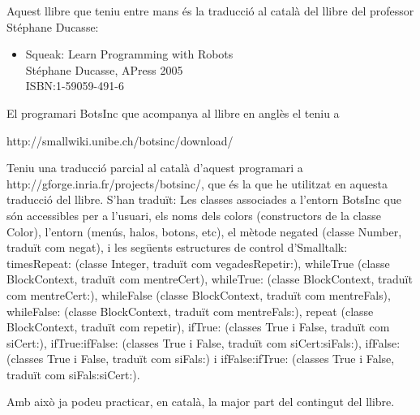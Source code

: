 \noindent
Aquest llibre que teniu entre mans és la traducció al català del llibre del professor Stéphane Ducasse:

\vspace*{3mm}

\noindent
\begin{itemize}
\item[] \textsf{Squeak: Learn Programming with Robots} \\ 
Stéphane Ducasse, APress 2005\\
ISBN:1-59059-491-6
\end{itemize}

\vspace*{3mm}

\noindent
El programari \textsf{BotsInc} que acompanya al llibre en anglès el teniu a 

\noindent
\textsf{http://smallwiki.unibe.ch/botsinc/download/}

\vspace*{3mm}

\noindent
Teniu una traducció parcial al català d'aquest programari a \textsf{http://gforge.inria.fr/projects/botsinc/}, que és la que he utilitzat en aquesta traducció del llibre. S'han traduït: Les classes associades a l'entorn \textsf{BotsInc} que són accessibles per a l'usuari, els noms dels colors (constructors de la classe \textsf{Color}), l'entorn (menús, halos, botons, etc), el mètode
\textsf{negated}  (classe \textsf{Number}, traduït com \textsf{negat}), i les següents estructures de control d'Smalltalk:
\textsf{timesRepeat:}  (classe \textsf{Integer}, traduït com \textsf{vegadesRepetir:}),
 \textsf{whileTrue}  (classe \textsf{BlockContext}, traduït com \textsf{mentreCert}),
 \textsf{whileTrue:}  (classe \textsf{BlockContext}, traduït com \textsf{mentreCert:}),
 \textsf{whileFalse}  (classe \textsf{BlockContext}, traduït com \textsf{mentreFals}),
 \textsf{whileFalse:}  (classe \textsf{BlockContext}, traduït com \textsf{mentreFals:}),
 \textsf{repeat}  (classe \textsf{BlockContext}, traduït com \textsf{repetir}),
 \textsf{ifTrue:}  (classes \textsf{True} i \textsf{False}, traduït com \textsf{siCert:}),
 \textsf{ifTrue:ifFalse:}  (classes \textsf{True} i \textsf{False}, traduït com \textsf{siCert:siFals:}),
 \textsf{ifFalse:}  (classes \textsf{True} i \textsf{False}, traduït com \textsf{siFals:}) i
 \textsf{ifFalse:ifTrue:}  (classes \textsf{True} i \textsf{False}, traduït com \textsf{siFals:siCert:}).

\noindent
Amb això ja podeu practicar, en català, la major part del contingut del llibre.

